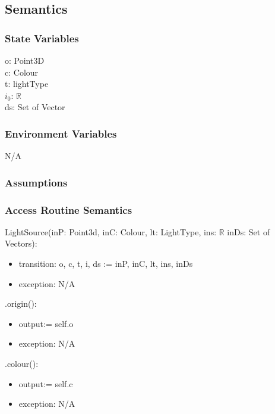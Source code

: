 \documentclass[12pt, titlepage]{article}
\begin{document}
\subsection{Semantics}
\subsubsection{State Variables}
o: Point3D \\ %
c: Colour \\
t: lightType \\
$i_{0}$: $\mathbb{R}$ \\
ds: Set of Vector \\ %

\subsubsection{Environment Variables}
N/A

\subsubsection{Assumptions}

\subsubsection{Access Routine Semantics}

\noindent LightSource(inP: Point3d, inC: Colour, lt: LightType, ins: 
$\mathbb{R}$ inDs: Set of Vectors):
\begin{itemize}
	\item transition: o, c, t, i, ds := inP, inC, lt, ins, inDs
	\item exception: N/A
\end{itemize}

\noindent .origin():
\begin{itemize}
	\item output:= self.o
	\item exception: N/A
\end{itemize}

\noindent .colour():
\begin{itemize}
	\item output:= self.c
	\item exception: N/A
\end{itemize}
\end{document}
